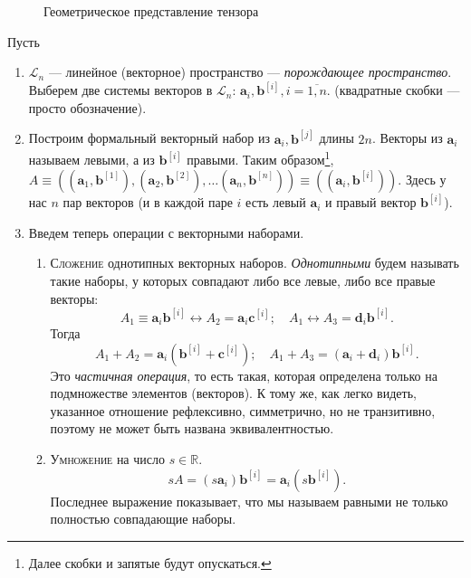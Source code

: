 \begin{figure}[ht!]
	\centering
	
	\caption{Геометрическое представление тензора}
	\label{fig:que2}
\end{figure}
\begin{definition}[геометрическое]
	Пусть
	\begin{enumerate}
		\item $\mathcal{L}_n$ --- линейное (векторное) пространство --- \emph{порождающее пространство}.
		Выберем две системы векторов в $\mathcal{L}_n$: $\mathbf{a}_i, \mathbf{b}^{[i]}, i = \overline{1, n}$.
		(квадратные скобки --- просто обозначение).
		
		\item Построим формальный векторный набор из $\mathbf{a}_i,
		\mathbf{b}^{[j]}$ длины $2n$.
		Векторы из $\mathbf{a}_i$ называем левыми, а из $\mathbf{b}^{[i]}$
		правыми. Таким образом\footnote{Далее скобки и запятые будут опускаться.}, 
		$A \equiv ((\mathbf{a}_1, \mathbf{b}^{[1]}), (\mathbf{a}_2,
		\mathbf{b}^{[2]}), \dots (\mathbf{a}_n, \mathbf{b}^{[n]}))
		\equiv ((\mathbf{a}_i, \mathbf{b}^{[i]}))$.
		Здесь у нас $ n $ пар векторов (и в каждой паре $ i $ есть левый $\mathbf{a}_i$ и правый вектор
		$\mathbf{b}^{[i]}$).
		
		\item Введем теперь операции с векторными наборами.
		\begin{enumerate}
			\item \textsc{Сложение} однотипных векторных наборов. \emph{Однотипными} будем называть такие наборы, у 
			которых совпадают либо все левые, либо все правые векторы:
			\[
			A_1 \equiv \mathbf{a}_i \mathbf{b}^{[i]} \leftrightarrow A_2 = \mathbf{a}_i \mathbf{c}^{[i]}; 
			\quad
			A_1 \leftrightarrow A_3 = \mathbf{d}_i \mathbf{b}^{[i]}.
			\]
			Тогда
			\[
			A_1+A_2 = \mathbf{a}_i (\mathbf{b}^{[i]} + \mathbf{c}^{[i]}); \quad
			A_1+A_3 = (\mathbf{a}_i + \mathbf{d}_i) \mathbf{b}^{[i]}.
			\]
      Это \emph{частичная операция}, то есть такая, которая определена только на
			подмножестве элементов (векторов). К тому же, как легко видеть, указанное
      отношение рефлексивно,
			симметрично, но не транзитивно, поэтому не может быть названа
			эквивалентностью.
			
			\item \textsc{Умножение} на число $s \in \mathbb{R}$.
			\[
			sA = (s \mathbf{a}_i) \mathbf{b}^{[i]} = \mathbf{a}_i (s \mathbf{b}^{[i]}).
			\]
			Последнее выражение показывает, что мы называем равными не только
			полностью совпадающие наборы.
			

\end{enumerate}
\end{enumerate}
\end{definition}
